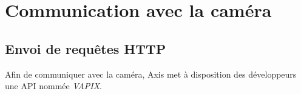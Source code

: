 \section{Communication avec la caméra}
\subsection{Envoi de requêtes HTTP}
Afin de communiquer avec la caméra, Axis met à disposition des développeurs une API nommée \textit{VAPIX}.